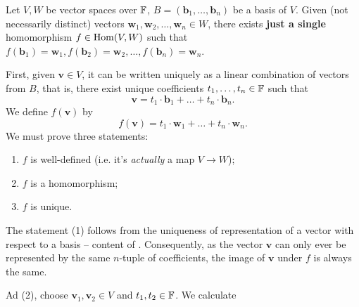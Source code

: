 \begin{theorem}{}{}
 Let $V,W$ be vector spaces over $\mathbb{F}$, $B = (\mathbf{b}_1,\ldots,\mathbf{b}_n)$
 be a basis of $V$. Given (not necessarily distinct) vectors
 $\mathbf{w}_1,\mathbf{w}_2,\ldots,\mathbf{w}_n \in W$, there exists
 \textbf{just a single} homomorphism $f \in \operatorname{Hom}(V,W)$ such that
 $f(\mathbf{b}_1) = \mathbf{w}_1, f(\mathbf{b}_2) =
 \mathbf{w}_2,\ldots,f(\mathbf{b}_n) = \mathbf{w}_n$.
\end{theorem}
\begin{thmproof}
 First, given $\mathbf{v} \in V$, it can be written uniquely as a linear
 combination of vectors from $B$, that is, there exist unique coefficients
 $t_1,\ldots,t_n \in \mathbb{F}$ such that
 \[
  \mathbf{v} = t_1 \cdot \mathbf{b}_1 + \ldots + t_n \cdot \mathbf{b}_n.
 \]
 We define $f(\mathbf{v})$ by
 \[
  f(\mathbf{v}) = t_1 \cdot \mathbf{w}_1 + \ldots + t_n \cdot \mathbf{w}_n.
 \]
 We must prove three statements:
 \begin{enumerate}
  \item $f$ is well-defined (i.e. it's \emph{actually} a map $V \to W$);
  \item $f$ is a homomorphism;
  \item $f$ is unique.
 \end{enumerate}
 The statement (1) follows from the uniqueness of representation of a vector
 with respect to a basis -- content of
 . Consequently, as the vector
 $\mathbf{v}$ can only ever be represented by the same $n$-tuple of
 coefficients, the image of $\mathbf{v}$ under $f$ is always the same.

 Ad (2), choose $\mathbf{v}_1,\mathbf{v}_2 \in V$ and $t_1,t_2 \in \mathbb{F}$. We
 calculate
 \begin{align*}
  
 \end{align*}
\end{thmproof}
